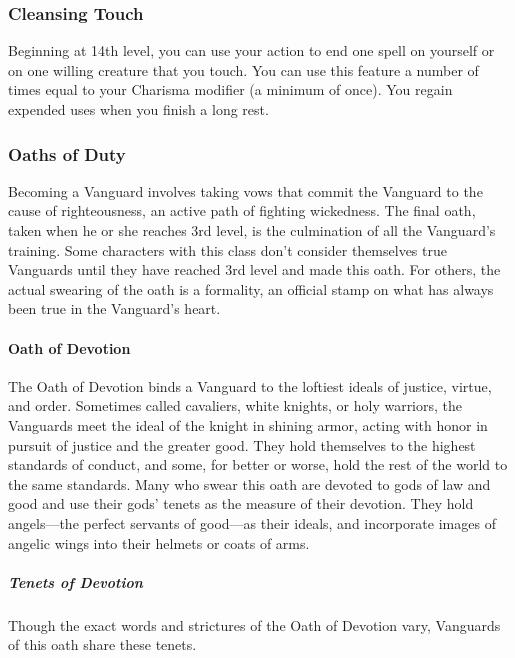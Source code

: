 \subsubsection{Cleansing Touch}\label{vanguard-feature-cleansing-touch}

Beginning at 14th level, you can use your action to end one spell on
yourself or on one willing creature that you touch. You can use this
feature a number of times equal to your Charisma modifier (a minimum of
once). You regain expended uses when you finish a long rest.

\subsubsection{Oaths of Duty}\label{vanguard-subclasses}

Becoming a Vanguard involves taking vows that commit the Vanguard to the
cause of righteousness, an active path of fighting wickedness. The final
oath, taken when he or she reaches 3rd level, is the culmination of all
the Vanguard's training. Some characters with this class don't consider
themselves true Vanguards until they have reached 3rd level and made
this oath. For others, the actual swearing of the oath is a formality,
an official stamp on what has always been true in the Vanguard's heart.

\paragraph{Oath of Devotion}\label{vanguard-subclasse-oath-of-devotion}

The Oath of Devotion binds a Vanguard to the loftiest ideals of justice,
virtue, and order. Sometimes called cavaliers, white knights, or holy
warriors, the Vanguards meet the ideal of the knight in shining armor,
acting with honor in pursuit of justice and the greater good. They hold
themselves to the highest standards of conduct, and some, for better or
worse, hold the rest of the world to the same standards. Many who swear
this oath are devoted to gods of law and good and use their gods' tenets
as the measure of their devotion. They hold angels---the perfect
servants of good---as their ideals, and incorporate images of angelic
wings into their helmets or coats of arms.

\subparagraph{Tenets of Devotion}\label{_tenets_of_devotion}

Though the exact words and strictures of the Oath of Devotion vary,
Vanguards of this oath share these tenets.

